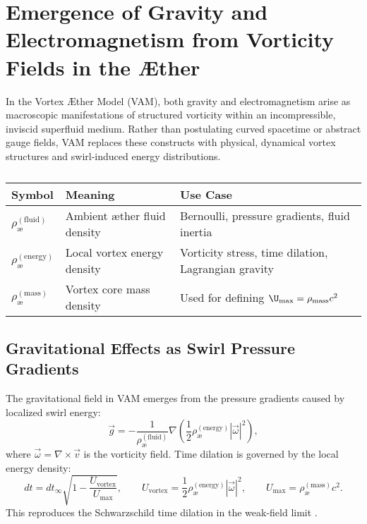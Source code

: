 \section{Emergence of Gravity and Electromagnetism from Vorticity Fields in the Æther}

In the Vortex \AE ther Model (VAM), both gravity and electromagnetism arise as macroscopic manifestations of structured vorticity within an incompressible, inviscid superfluid medium. Rather than postulating curved spacetime or abstract gauge fields, VAM replaces these constructs with physical, dynamical vortex structures and swirl-induced energy distributions.


\begin{table}
    \centering
    \begin{tabular}{lll}
        \toprule
        \textbf{Symbol} & \textbf{Meaning} & \textbf{Use Case} \\
        \midrule
          \(\rho_\text{\ae}^{(\text{fluid})}\) & Ambient æther fluid density & Bernoulli, pressure gradients, fluid inertia \\
          \(\rho_\text{\ae}^{(\text{energy})}\) & Local vortex energy density & Vorticity stress, time dilation, Lagrangian gravity \\
          \(\rho_\text{\ae}^{(\text{mass})}\) & Vortex core mass density & Used for defining \(\U_{\text{max}} = \rho_\text{mass} c^2\) \\
        \bottomrule
    \end{tabular}
    \caption{}
    \label{tab:densities}
\end{table}

\subsection{Gravitational Effects as Swirl Pressure Gradients}

The gravitational field in VAM emerges from the pressure gradients caused by localized swirl energy:
\begin{equation}
\vec{g} = -\frac{1}{\rho_\text{\ae}^{(\text{fluid})}} \nabla \left( \frac{1}{2} \rho_\text{\ae}^{(\text{energy})} |\vec{\omega}|^2 \right),
\end{equation}
where \( \vec{\omega} = \nabla \times \vec{v} \) is the vorticity field. Time dilation is governed by the local energy density:
\begin{equation}
dt = dt_\infty \sqrt{1 - \frac{U_{\text{vortex}}}{U_{\text{max}}}}, \qquad
U_{\text{vortex}} = \frac{1}{2} \rho_\text{\ae}^{(\text{energy})} |\vec{\omega}|^2, \qquad
U_{\text{max}} = \rho_\text{\ae}^{(\text{mass})} c^2.
\end{equation}
This reproduces the Schwarzschild time dilation in the weak-field limit \cite{MTW1973}.

